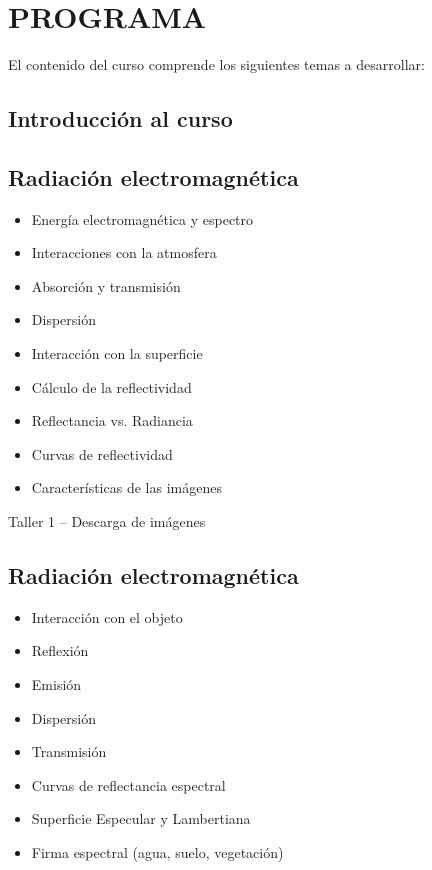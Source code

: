 \documentclass[a4paper,twoside,11pt,]{article}
\begin{document}
\section{PROGRAMA}
El contenido del curso comprende los siguientes temas a desarrollar:\\

\subsection*{Introducción al curso}

\subsection {Radiación electromagnética}
\begin{itemize}
\item Energía electromagnética y espectro
\item Interacciones con la atmosfera
\item Absorción y transmisión
\item Dispersión
\item Interacción con la superficie
\item Cálculo de la reflectividad
\item Reflectancia vs. Radiancia
\item Curvas de reflectividad
\item Características de las imágenes
\end{itemize}

\begin{tcolorbox}[enhanced,width=5in,center upper,  fontupper=\large\bfseries,drop shadow southwest,sharp corners]
Taller 1 -- Descarga de imágenes
\end{tcolorbox}

\subsection {Radiación electromagnética}
\begin{itemize}
\item Interacción con el objeto
\item Reflexión
\item Emisión
\item Dispersión
\item Transmisión
\item Curvas de reflectancia espectral
\item Superficie Especular y Lambertiana
\item Firma espectral (agua, suelo, vegetación)
\end{itemize}
\end{document}
